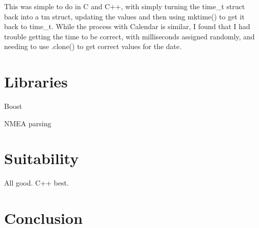 \documentclass{article}
\begin{document}
This was simple to do in C and C++, with simply turning the time\_t struct back into a tm struct, updating the values and then using mktime() to get it back to time\_t. While the process with Calendar is similar, I found that I had trouble getting the time to be correct, with milliseconds assigned randomly, and needing to use .clone() to get correct values for the date.








\section{Libraries}

Boost

NMEA parsing



\section{Suitability}

All good. C++ best.




\clearpage

\section{Conclusion}


\clearpage
\end{document}

